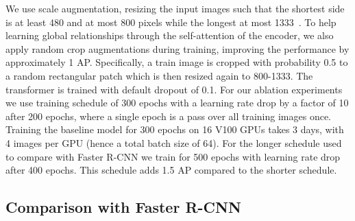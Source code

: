 We use scale augmentation, resizing the input images such that the shortest side is at least 480 and at most 800 pixels while the longest at most 1333~\cite{wu2019detectron2}.
To help learning global relationships through the self-attention of the encoder, we also apply random crop augmentations during training, improving the performance by approximately 1 AP.
Specifically, a train image is cropped with probability 0.5 to a
random rectangular patch which is then resized again to 800-1333.
The transformer is trained with default dropout of 0.1.
For our ablation experiments we use training schedule 
of 300 epochs with a learning rate drop by a factor of 10 after 200 epochs,
where a single epoch is a pass over all training images once.
{Training the baseline model for 300 epochs on 16 V100 GPUs takes 3 days,
with 4 images per GPU (hence a total batch size of 64).}
For the longer schedule used to compare with Faster R-CNN we train
{for 500 epochs with learning rate drop after 400 epochs.
This schedule adds 1.5 AP compared to the shorter schedule.}


\subsection{Comparison with Faster R-CNN}

